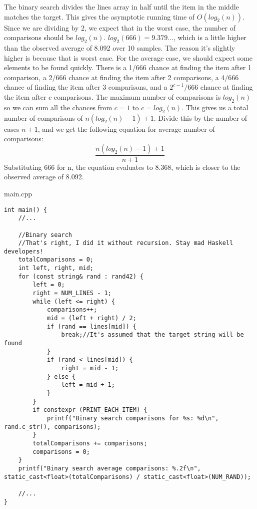 \documentclass[letterpaper, 10pt,DIV=13]{scrartcl}
\numberwithin{equation}{section} %
\numberwithin{figure}{section} %
\numberwithin{table}{section} %
\begin{document}
The binary search divides the lines array in half until the item in the middle matches the target. This gives the
asymptotic running time of $O(log_2(n))$. Since we are dividing by 2, we expect that in the worst case, the
number of comparisons should be $log_2(n)$. $log_2(666)=9.379...$, which is a little higher than the
observed average of 8.092 over 10 samples. The reason it's slightly higher is because that is worst case. For the
average case, we should expect some elements to be found quickly. There is a 1/666 chance at finding
the item after 1 comparison, a 2/666 chance at finding the item after 2 comparisons, a 4/666 chance of finding
the item after 3 comparisons, and a $2^{c-1}/666$ chance at finding the item after $c$ comparisons. The maximum
number of comparisons is $log_2(n)$ so we can sum all the chances from $c=1$ to $c=log_2(n)$. This gives us a
total number of comparisons of $n(log_2(n)-1)+1$. Divide this by the number of cases $n+1$, and we get the
following equation for average number of comparisons:
\begin{equation}
\frac{n\left(log_2\left(n\right)-1\right)+1}{n+1}
\end{equation}
Substituting 666 for n, the equation evaluates to 8.368, which is closer to the observed average of 8.092.

main.cpp
\begin{verbatim}
int main() {
    //...

    //Binary search
    //That's right, I did it without recursion. Stay mad Haskell developers!
    totalComparisons = 0;
    int left, right, mid;
    for (const string& rand : rand42) {
        left = 0;
        right = NUM_LINES - 1;
        while (left <= right) {
            comparisons++;
            mid = (left + right) / 2;
            if (rand == lines[mid]) {
                break;//It's assumed that the target string will be found
            }
            if (rand < lines[mid]) {
                right = mid - 1;
            } else {
                left = mid + 1;
            }
        }
        if constexpr (PRINT_EACH_ITEM) {
            printf("Binary search comparisons for %s: %d\n", rand.c_str(), comparisons);
        }
        totalComparisons += comparisons;
        comparisons = 0;
    }
    printf("Binary search average comparisons: %.2f\n", static_cast<float>(totalComparisons) / static_cast<float>(NUM_RAND));

    //...
}
\end{verbatim}
\end{document}
